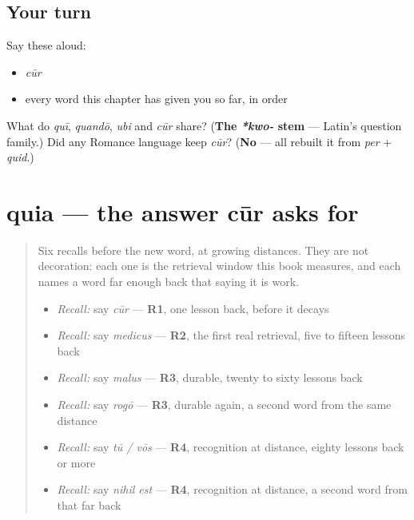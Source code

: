 \subsection*{Your turn}
Say these aloud:

\begin{itemize}
\raggedright
  \item \emph{cūr}
  \item every word this chapter has given you so far, in order
\end{itemize}

\begin{tcolorbox}[breakable,colback=teal!4,colframe=teal!35!black,title={Before you move on}]
What do \emph{quī}, \emph{quandō}, \emph{ubi} and \emph{cūr} share? (\textbf{The \emph{*kwo-} stem} — Latin's question family.) Did any Romance language keep \emph{cūr}? (\textbf{No} — all rebuilt it from \emph{per} + \emph{quid}.)
\end{tcolorbox}
\section[quia]{quia — the answer cūr asks for}

\label{lesson:LA-C52-quia}



\begin{quote}
Six recalls before the new word, at growing distances. They are not decoration: each one is the retrieval window this book measures, and each names a word far enough back that saying it is work.

\begin{itemize}
\raggedright
  \item \emph{Recall:} say \emph{cūr} — \textbf{R1}, one lesson back, before it decays
  \item \emph{Recall:} say \emph{medicus} — \textbf{R2}, the first real retrieval, five to fifteen lessons back
  \item \emph{Recall:} say \emph{malus} — \textbf{R3}, durable, twenty to sixty lessons back
  \item \emph{Recall:} say \emph{rogō} — \textbf{R3}, durable again, a second word from the same distance
  \item \emph{Recall:} say \emph{tū / vōs} — \textbf{R4}, recognition at distance, eighty lessons back or more
  \item \emph{Recall:} say \emph{nihil est} — \textbf{R4}, recognition at distance, a second word from that far back
\end{itemize}
\end{quote}

